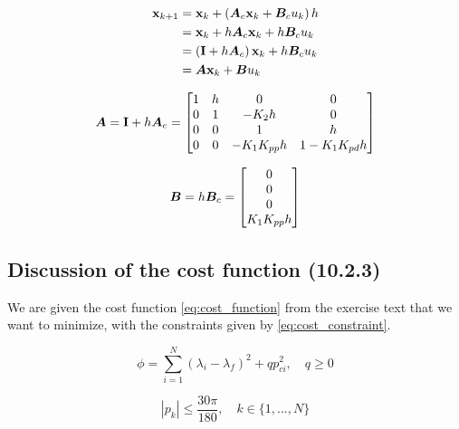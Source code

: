 \begin{equation}\label{eq:disc}
\begin{aligned}
	\mathbf{x}_{k+1} &= \mathbf{x}_{k} + \left( \bm{A}_{c} \mathbf{x}_{k} + \bm{B}_c u_{k} \right) h \\
				&= \mathbf{x}_{k} + h\bm{A}_{c}\mathbf{x}_{k} + h\bm{B}_{c}u_{k} \\
				&= \left( \mathbf{I} + h\bm{A}_{c} \right) \mathbf{x}_{k} + h\bm{B}_{c}u_{k} \\
				&= \bm{A}\mathbf{x}_{k} + \bm{B}u_{k}
\end{aligned}
\end{equation}

\begin{equation}\label{eq:disc_matrix_A}
	\bm{A} = \mathbf{I} + h\bm{A}_{c} =
	\begin{bmatrix}
		1 & h & 0 & 0 \\
		0 & 1 & -K_{2}h & 0 \\
		0 & 0 & 1 & h \\
		0 & 0 & -K_{1}K_{pp}h	& 1-K_{1}K_{pd}h
	\end{bmatrix}
\end{equation}

\begin{equation}\label{eq:disc_matrix_B}
	\bm{B} = h\bm{B}_c =
	\begin{bmatrix} 0 \\ 0 \\ 0 \\ K_{1}K_{pp}h \end{bmatrix}
\end{equation}


\subsection{Discussion of the cost function (10.2.3)}
We are given the cost function \eqref{eq:cost_function} from the exercise text \cite{_helicopter_2015} that we want to minimize, with the constraints given by \eqref{eq:cost_constraint}.


\begin{equation} \label {eq:cost_function}
	\phi = \sum\limits_{i=1}^N (\lambda_i - \lambda_f)^2 + q p_{ci}^2, \quad q \geq 0 
\end{equation}

\begin{equation} \label{eq:cost_constraint}
	|p_k| \leq \frac{30 \pi}{180}, \quad k \in \{ 1, ..., N \}
\end{equation}


